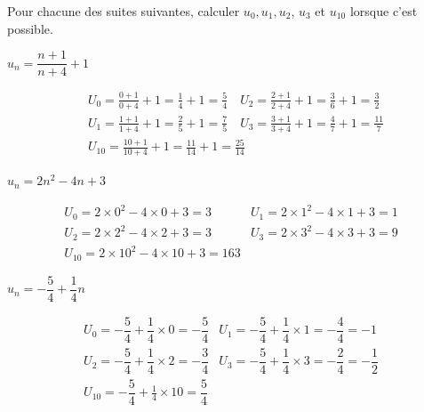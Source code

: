 \documentclass[12pt,a4paper]{article}  %
\begin{document}
Pour chacune des suites suivantes, calculer $u_0, u_1, u_2$, $u_3$ et $u_{10}$ lorsque c'est possible.
	\begin{enumMet}
		\item $u_n=\dfrac{n+1}{n+4}+1$
		\begin{corrBox}
			$$
			\begin{aligned}
				& U_0=\frac{0+1}{0+4}+1=\frac{1}{4}+1=\frac{5}{4} \quad U_2=\frac{2+1}{2+4}+1=\frac{3}{6}+1=\frac{3}{2} \\
				& U_1=\frac{1+1}{1+4}+1=\frac{2}{5}+1=\frac{7}{5} \quad U_3=\frac{3+1}{3+4}+1=\frac{4}{7}+1=\frac{11}{7} \\
				& U_{10}=\frac{10+1}{10+4}+1=\frac{11}{14}+1=\frac{25}{14}
			\end{aligned}
			$$	
		\end{corrBox}
		\item $u_n=2n^2-4 n+3$
		\begin{corrBox}
			$$
			\begin{array}{cc}
				U_0=2 \times 0^2-4 \times 0+3=3 & U_1=2 \times 1^2-4 \times 1+3=1 \\
				U_2=2 \times 2^2-4 \times 2+3=3 & U_3=2 \times 3^2-4 \times 3+3=9 \\
				U_{10}=2 \times 10^2-4 \times 10+3=163
			\end{array}
			$$		
		\end{corrBox}
		\item {} $u_n=-\dfrac{5}{4}+\dfrac{1}{4} n$
		\begin{corrBox}
			$$
			\begin{array}{cl}
				U_0=-\dfrac{5}{4}+\dfrac{1}{4} \times 0=-\dfrac{5}{4} & U_1=-\dfrac{5}{4}+\dfrac{1}{4} \times 1=-\dfrac{4}{4}=-1 \\
				U_2=-\dfrac{5}{4}+\dfrac{1}{4} \times 2=-\dfrac{3}{4} & U_3=-\dfrac{5}{4}+\dfrac{1}{4} \times 3=-\dfrac{2}{4}=-\dfrac{1}{2} \\
				U_{10}=-\dfrac{5}{4}+\frac{1}{4} \times 10=\dfrac{5}{4}
			\end{array}
			$$		
		\end{corrBox}
	\end{enumMet}

\end{document}
